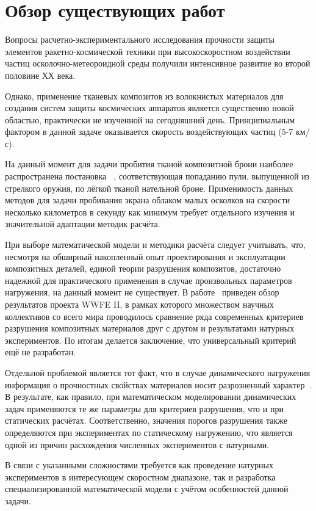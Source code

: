 \section{Обзор существующих работ}\label{ch:overview}

Вопросы расчетно-экспериментального исследования прочности защиты элементов ракетно-космической техники при
высокоскоростном воздействии частиц осколочно-метеороидной среды получили интенсивное развитие во второй
половине ХХ века.

Однако, применение тканевых композитов из волокнистых материалов для создания систем защиты космических аппаратов
является существенно новой областью, практически не изученной на сегодняшний день.
Принципиальным фактором в данной задаче оказывается скорость воздействующих частиц (5-7 км/с).

На данный момент для задачи пробития тканой композитной брони наиболее распространена постановка
~\cite{kobylkin2014,kharchenko,walker1999,walker2001,porval,bkhatnagar}, соответствующая попаданию пули, 
выпущенной из стрелкого оружия, по лёгкой тканой нательной броне.
Применимость данных методов для задачи пробивания экрана облаком малых осколков на скорости несколько километров в
секунду как минимум  требует отдельного изучения и значительной адаптации методик расчёта.

При выборе математической модели и методики расчёта следует  учитывать, что, несмотря на обширный накопленный опыт
проектирования и  эксплуатации композитных деталей, единой теории разрушения композитов,  достаточно надежной для
практического применения в случае произвольных  параметров нагружения, на данный момент не существует.
В работе~\cite{kaddour} приведен обзор результатов проекта WWFE II, в рамках которого  множеством научных коллективов со всего
мира проводилось сравнение ряда  современных критериев разрушения композитных материалов друг с  другом и результатами
натурных экспериментов.
По итогам делается  заключение, что универсальный критерий ещё не разработан.

Отдельной проблемой является тот факт, что в случае динамического  нагружения информация о прочностных свойствах
материалов носит разрозненный характер~\cite{kobylkin2014}.
В результате, как правило, при математическом моделировании динамических задач применяются те же параметры для
критериев разрушения, что и при статических расчётах.
Соответственно, значения порогов разрушения также определяются при экспериментах по  статическому нагружению, что
является одной из причин расхождения численных экспериментов с натурными.

В связи с указанными сложностями требуется как проведение натурных экспериментов в интересующем скоростном
диапазоне, так и разработка специализированной математической модели с учётом особенностей данной задачи.

